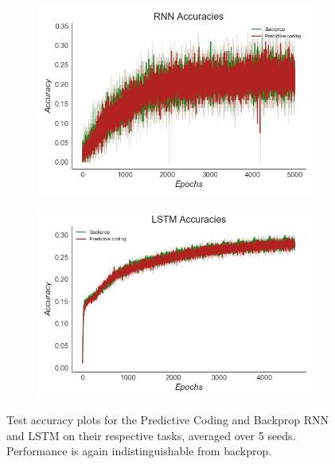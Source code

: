 \begin{figure}[ht]
\vspace{-0.3cm}
\hspace{-0.6cm}
\begin{subfigure}{.5\textwidth}
  \centering
  \includegraphics[width=1\linewidth]{chapter_6_figures/RNN_Accuracies_super_prelim_6.jpg}  
\end{subfigure}
\begin{subfigure}{.5\textwidth}
  \centering
  \includegraphics[width=1\linewidth]{chapter_6_figures/LSTM_Accuracies_super_prelim_6.jpg}  
\end{subfigure}
\caption{Test accuracy plots for the Predictive Coding and Backprop RNN and LSTM on their respective tasks, averaged over 5 seeds. Performance is again indistinguishable from backprop.}

\label{pc_rnn_lstm_results_figure}
\vspace{-0.3cm}
\end{figure}

